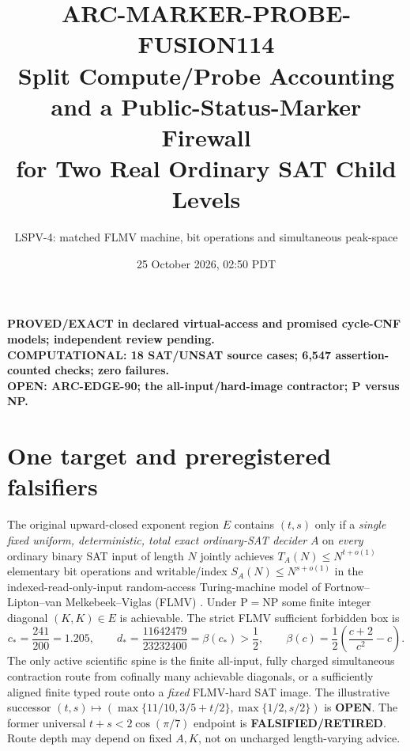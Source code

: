 \documentclass[11pt]{article}
\title{ARC-MARKER-PROBE-FUSION114\\
\large Split Compute/Probe Accounting and a Public-Status-Marker Firewall\\
for Two Real Ordinary SAT Child Levels}
\author{LSPV-4: matched FLMV machine, bit operations and simultaneous peak-space}
\date{25 October 2026, 02:50 PDT}
\begin{document}
\maketitle
\begin{center}
\textbf{PROVED/EXACT in declared virtual-access and promised cycle-CNF models;
independent review pending.}\\
\textbf{COMPUTATIONAL: 18 SAT/UNSAT source cases; 6,547 assertion-counted
checks; zero failures.}\\
\textbf{OPEN: ARC-EDGE-90; the all-input/hard-image contractor; P versus NP.}
\end{center}

\section{One target and preregistered falsifiers}
The original upward-closed exponent region \(E\) contains \((t,s)\) only
if a \emph{single fixed uniform, deterministic, total exact ordinary-SAT
decider} \(A\) on \emph{every} ordinary binary SAT input of length \(N\)
jointly achieves \(T_A(N)\le N^{t+o(1)}\) elementary bit operations and
writable/index \(S_A(N)\le N^{s+o(1)}\) in the indexed-read-only-input
random-access Turing-machine model of Fortnow--Lipton--van
Melkebeek--Viglas (FLMV) \cite{FLMV}. Under \(\mathrm P=\mathrm{NP}\)
some finite integer diagonal \((K,K)\in E\) is achievable.
The strict FLMV sufficient forbidden box is
\[
 c_*=\frac{241}{200}=1.205,\qquad
 d_*=\frac{11642479}{23232400}=\beta(c_*)>\frac12,\qquad
 \beta(c)=\frac12\left(\frac{c+2}{c^2}-c\right).
\]
The only active scientific spine is the finite all-input, fully charged
simultaneous contraction route from cofinally many achievable diagonals,
or a sufficiently aligned finite typed route onto a \emph{fixed}
FLMV-hard SAT image. The illustrative successor
\((t,s)\mapsto
(\max\{11/10,3/5+t/2\},\max\{1/2,s/2\})\) is \textbf{OPEN}.
The former universal \(t+s<2\cos(\pi/7)\) endpoint is
\textbf{FALSIFIED/RETIRED}. Route depth may depend on fixed \(A,K\),
not on uncharged length-varying advice.
\end{document}
